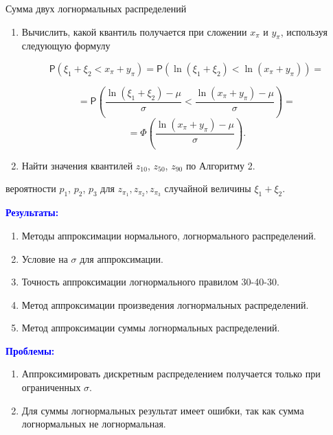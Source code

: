 \documentclass[ucs, notheorems, handout]{beamer}
\newenvironment{pr3}{\par\noindent{\bf Результат:}}{}
\begin{document}
\begin{frame}{Сумма двух логнормальных распределений }
	

	\begin{enumerate}
		\item Вычислить, какой квантиль получается при сложении $x_{\pi}$ и $y_{\pi}$, используя следующую формулу
		
		\begin{equation*}
			\mathsf{P}(\xi_{1}+\xi_{2}< x_{\pi}+y_{\pi}) = \mathsf{P}(\ln(\xi_{1}+\xi_{2})<\ln(x_{\pi}+y_{\pi}))=
		\end{equation*}
		
		
			\[=\mathsf{P}\left(\displaystyle{\frac{\ln(\xi_{1}+\xi_{2})-\mu}{\sigma}}<\displaystyle{\frac{\ln(x_{\pi}+y_{\pi})-\mu}{\sigma}}\right)=\]\[ =\Phi\left(\dfrac{\ln(x_{\pi}+y_{\pi})-\mu}{\sigma}\right).\]
		
		
		\item Найти значения квантилей $z_{10}$, $z_{50}$, $z_{90}$ по Алгоритму 2.
	\end{enumerate}
	\begin{pr3}\end{pr3} вероятности $p_{1}$, $p_{2}$, $p_{3}$ для $z_{\pi_{1}}, z_{\pi_{2}}, z_{\pi_{3}}$ случайной величины $\xi_{1} + \xi_{2}$.
	
	
\end{frame}

\begin{frame}{}
	
	
	\textcolor{blue}{\hbox{\textbf{Результаты:}}}
	\begin{enumerate}
		\item Методы аппроксимации нормального, логнормального распределений.
		\item Условие на $\sigma$ для аппроксимации.
		\item Точность аппроксимации логнормального правилом 30-40-30.
		\item Метод аппроксимации произведения логнормальных распределений.
		\item Метод аппроксимации суммы логнормальных распределений.
	\end{enumerate}
	\bigskip
	\textcolor{blue}{\hbox{\textbf{Проблемы:}}}
	\begin{enumerate}
		\item Аппроксимировать дискретным распределением получается только при ограниченных $\sigma$.
		\item  Для суммы логнормальных результат имеет ошибки, так как сумма логнормальных не логнормальная.
	\end{enumerate}
	
\end{frame}


	
	
\end{document}
